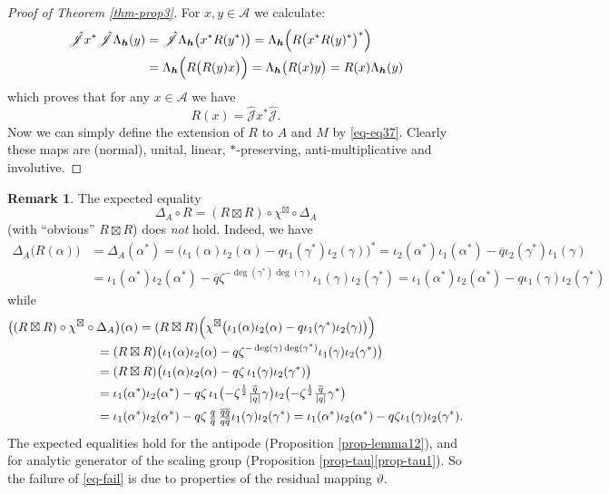 \documentclass[12pt,reqno,a4paper]{amsart}
\theoremstyle{definition}
\newtheorem{remark}[proposition]{Remark}
\newcommand{\comp}{\circ}
\newcommand{\cA}{\mathscr{A}}
\newcommand{\bh}{{\boldsymbol{h}}}
\newcommand{\cJhat}{\hat{\mathscr{J}}}
\numberwithin{equation}{section}
\begin{document}
\begin{proof}[Proof of Theorem \ref{thm-prop3}]
For $x,y\in\cA$ we calculate:
\begin{align*}
\cJhat x^*\cJhat\Lambda_\bh(y)
&=\cJhat\Lambda_\bh\bigl(x^*R(y^*)\bigr)
=\Lambda_\bh\Bigl(R\bigl(x^*R(y)^*\bigr)^*\Bigr)\\
&=\Lambda_\bh\Bigl(R\bigl(R(y)x\bigr)\Bigr)
=\Lambda_\bh\bigl(R(x)y\bigr)=R(x)\Lambda_\bh(y)
\end{align*}
which proves that for any $x\in\cA$ we have
\begin{equation}\label{eq-eq37}
R(x)=\cJhat x^*\cJhat.
\end{equation}
Now we can simply define the extension of $R$ to $A$ and $M$ by \eqref{eq-eq37}. Clearly these maps are (normal), unital, linear, $*$-preserving, anti-multiplicative and involutive.
\end{proof}

\begin{remark}
The expected equality
\begin{equation}\label{eq-fail}
\Delta_A\comp R=(R\boxtimes R)\comp\chi^\boxtimes\comp\Delta_A
\end{equation}
(with ``obvious'' $R\boxtimes R$) does \emph{not} hold. Indeed, we have
\begin{align*}
\Delta_A\bigl(R(\alpha)\bigr)&=\Delta_A(\alpha^*)
=\bigl(\iota_1(\alpha)\iota_2(\alpha)-q\iota_1(\gamma^*)\iota_2(\gamma)\bigr)^*
=\iota_2(\alpha^*)\iota_1(\alpha^*)-\overline{q}\iota_2(\gamma^*)\iota_1(\gamma)\\
&=\iota_1(\alpha^*)\iota_2(\alpha^*)-\overline{q}
\zeta^{-\deg(\gamma^*)\deg(\gamma)}\iota_1(\gamma)\iota_2(\gamma^*)
=\iota_1(\alpha^*)\iota_2(\alpha^*)-q\iota_1(\gamma)\iota_2(\gamma^*)
\end{align*}
while
\begin{align*}
\bigl((R\boxtimes R)\comp\chi^\boxtimes\:\comp\:&\Delta_A\bigr)(\alpha)
=(R\boxtimes R)\Bigl(\chi^\boxtimes\bigl(
\iota_1(\alpha)\iota_2(\alpha)-q\iota_1(\gamma^*)\iota_2(\gamma)\bigr)\Bigr)\\
&=(R\boxtimes R)\bigl(
\iota_1(\alpha)\iota_2(\alpha)
-q\zeta^{-\deg(\gamma)\deg(\gamma^*)}
\iota_1(\gamma)\iota_2(\gamma^*)
\bigr)\\
&=(R\boxtimes R)\bigl(
\iota_1(\alpha)\iota_2(\alpha)-q\zeta\,\iota_1(\gamma) \iota_2(\gamma^*)
\bigr)\\
&=\iota_1(\alpha^*)\iota_2(\alpha^*)
-q\zeta\,\iota_1\bigl(-\zeta^{\frac{1}{2}}\tfrac{\overline{q}}{|q|}\gamma\bigr)
\iota_2\bigl(-\zeta^{\frac{1}{2}}\tfrac{\overline{q}}{|q|}\gamma^*\bigr)\\
&=\iota_1(\alpha^*)\iota_2(\alpha^*)-q\zeta\,\tfrac{q}{\overline{q}}
\,\tfrac{\overline{q}\overline{q}}{q\overline{q}}
\iota_1(\gamma)\iota_2(\gamma^*)
=\iota_1(\alpha^*)\iota_2(\alpha^*)-q\zeta\iota_1(\gamma)\iota_2(\gamma^*).
\end{align*}
The expected equalities hold for the antipode (Proposition \ref{prop-lemma12}), and for analytic generator of the scaling group (Proposition \ref{prop-tau}\eqref{prop-tau1}). So the failure of
\eqref{eq-fail} is due to properties of the residual mapping $\vartheta$.
\end{remark}
\end{document}
